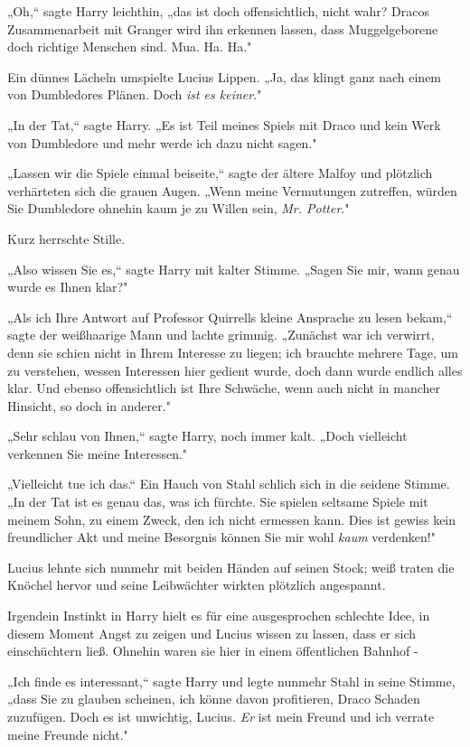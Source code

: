 {„Oh,“ sagte Harry leichthin, „das ist doch offensichtlich, nicht wahr? Dracos Zusammenarbeit mit Granger wird ihn erkennen lassen, dass Muggelgeborene doch richtige Menschen sind. Mua. Ha. Ha."

Ein dünnes Lächeln umspielte Lucius Lippen. „Ja, das klingt ganz nach einem von Dumbledores Plänen. Doch \emph{ist es keiner}."

„In der Tat,“ sagte Harry. „Es ist Teil meines Spiels mit Draco und kein Werk von Dumbledore und mehr werde ich dazu nicht sagen."

„Lassen wir die Spiele einmal beiseite,“ sagte der ältere Malfoy und plötzlich verhärteten sich die grauen Augen. „Wenn meine Vermutungen zutreffen, würden Sie Dumbledore ohnehin kaum je zu Willen sein, \emph{Mr. Potter}."

Kurz herrschte Stille.

„Also wissen Sie es,“ sagte Harry mit kalter Stimme. „Sagen Sie mir, wann genau wurde es Ihnen klar?"

„Als ich Ihre Antwort auf Professor Quirrells kleine Ansprache zu lesen bekam,“ sagte der weißhaarige Mann und lachte grimmig. „Zunächst war ich verwirrt, denn sie schien nicht in Ihrem Interesse zu liegen; ich brauchte mehrere Tage, um zu verstehen, wessen Interessen hier gedient wurde, doch dann wurde endlich alles klar. Und ebenso offensichtlich ist Ihre Schwäche, wenn auch nicht in mancher Hinsicht, so doch in anderer."

„Sehr schlau von Ihnen,“ sagte Harry, noch immer kalt. „Doch vielleicht verkennen Sie meine Interessen."

„Vielleicht tue ich das.“ Ein Hauch von Stahl schlich sich in die seidene Stimme. „In der Tat ist es genau das, was ich fürchte. Sie spielen seltsame Spiele mit meinem Sohn, zu einem Zweck, den ich nicht ermessen kann. Dies ist gewiss kein freundlicher Akt und meine Besorgnis können Sie mir wohl \emph{kaum} verdenken!"

Lucius lehnte sich nunmehr mit beiden Händen auf seinen Stock; weiß traten die Knöchel hervor und seine Leibwächter wirkten plötzlich angespannt.

Irgendein Instinkt in Harry hielt es für eine ausgesprochen schlechte Idee, in diesem Moment Angst zu zeigen und Lucius wissen zu lassen, dass er sich einschüchtern ließ. Ohnehin waren sie hier in einem öffentlichen Bahnhof -

„Ich finde es interessant,“ sagte Harry und legte nunmehr Stahl in seine Stimme, „dass Sie zu glauben scheinen, ich könne davon profitieren, Draco Schaden zuzufügen. Doch es ist unwichtig, Lucius. \emph{Er} ist mein Freund und ich verrate meine Freunde nicht."

}
